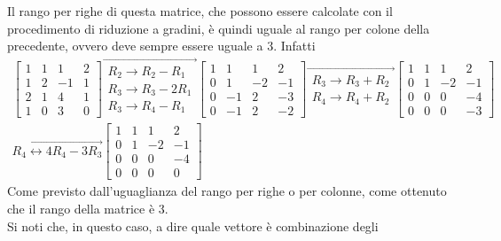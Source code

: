 \documentclass{book}
\theoremstyle{definition}
\theoremstyle{plain}
\begin{document}
Il rango per righe di questa matrice, che possono essere calcolate con il
procedimento di riduzione a gradini, è quindi uguale al rango per colone
della precedente, ovvero deve sempre essere uguale a 3. Infatti
\begin{equation}
  \label{eq:guess-jorda5}
  \begin{matrix}
    \begin{bmatrix}
      1 & 1 & 1& 2\\
      1 & 2 & -1 & 1\\
      2 & 1 & 4 & 1\\
      1 & 0 & 3 & 0
    \end{bmatrix}
    \overrightarrow{
    \begin{matrix}
      R_2\to R_2- R_1\\
      R_3\to R_3-2R_1\\
      R_3\to R_4-R_1
    \end{matrix}
    }
    \begin{bmatrix}
      1 & 1 & 1 & 2\\
      0 & 1 & -2 & -1 \\
      0 & -1 & 2 & -3\\
      0 & -1 & 2 & -2
    \end{bmatrix}
    \overrightarrow{
    \begin{matrix}
      R_3\to R_3+R_2\\
      R_4\to R_4+R_2
    \end{matrix}
    }
    \begin{bmatrix}
      1 & 1 & 1 & 2\\
      0 & 1 & -2 & -1\\
      0 & 0 & 0 & -4\\
      0 & 0 & 0 & -3
    \end{bmatrix}\\
    \overrightarrow{
    R_4\leftrightarrow 4R_4-3R_3}
    \begin{bmatrix}
      1 & 1 & 1 & 2\\
      0 & 1 & -2 & -1\\
      0 & 0 & 0 & -4\\
      0 & 0 & 0 & 0
    \end{bmatrix}
  \end{matrix}
\end{equation}
Come previsto dall'uguaglianza del rango per righe o per colonne, come
ottenuto che il rango della matrice è 3.\\
Si noti che, in questo caso, a dire quale vettore è combinazione degli
\end{document}
